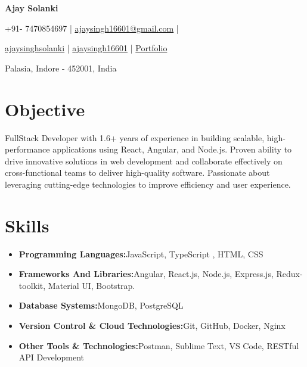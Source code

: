 \documentclass[a4paper,11pt]{article}
\newcommand{\resumeItem}[2]{
  \item{
    \textbf{#1}{\hspace{0.5mm}#2 \vspace{-0.5mm}}
  }
}
\newcommand{\resumeSubItem}[2]{\resumeItem{#1}{#2}\vspace{-4pt}}
\newcommand{\resumeHeadingSkillStart}{\begin{itemize}[leftmargin=*,itemsep=1.7mm, rightmargin=2ex]}
\newcommand{\resumeHeadingSkillEnd}{\end{itemize}\vspace{-2mm}}
\newcommand{\socialicon}[1]{\raisebox{-0.05em}{\resizebox{!}{1em}{#1}}}
\newcommand{\headerfontiii}{\fontfamily{ppl}\selectfont} %
\begin{document}
\headerfontiii

\begin{center}
    {\Huge\textbf{Ajay Solanki}}
\end{center}
\vspace{-5mm}

\begin{center}
    \small{
    +91-
    7470854697 | \href{mailto:ajaysingh16601@gmail.com}{ajaysingh16601@gmail.com} |
    }
\end{center}
\vspace{-5.5mm}

\begin{center}
    \small{
    \socialicon{\faLinkedin} \href{https://www.linkedin.com/in/ajaysinghsolanki/}{ajaysinghsolanki} | 
    \socialicon{\faGithub} \href{https://github.com/ajaysingh16601}{ajaysingh16601} | 
    \socialicon{\faIcon{globe}} \href{https://portfolio-threejs-ashy.vercel.app/}{Portfolio} 
    }
\end{center}
\vspace{-5.5mm}
\begin{center}
    \small{Palasia, Indore - 452001, India}
\end{center}

\vspace{-4mm}

\section{\textbf{Objective}}
\vspace{1mm}
\small{
  FullStack Developer with 1.6+ years of experience in building scalable, high-performance applications using React, Angular, and Node.js. Proven ability to drive innovative solutions in web development and collaborate effectively on cross-functional teams to deliver high-quality software. Passionate about leveraging cutting-edge technologies to improve efficiency and user experience. 
}
\vspace{-2mm}


\section{\textbf{Skills}}
\vspace{-0.2mm}
  \resumeHeadingSkillStart
    \resumeSubItem{Programming Languages:}
      {JavaScript, TypeScript , HTML, CSS}
    \resumeSubItem{Frameworks And Libraries:}
      {Angular, React.js, Node.js, Express.js, Redux-toolkit, Material UI, Bootstrap.}
    \resumeSubItem{Database Systems:}
      {MongoDB, PostgreSQL}
    \resumeSubItem{Version Control \& Cloud Technologies:}
      {Git, GitHub, Docker, Nginx}
    \resumeSubItem{Other Tools \& Technologies:}
      {Postman, Sublime Text, VS Code, RESTful API Development }
  \resumeHeadingSkillEnd
\end{document}
